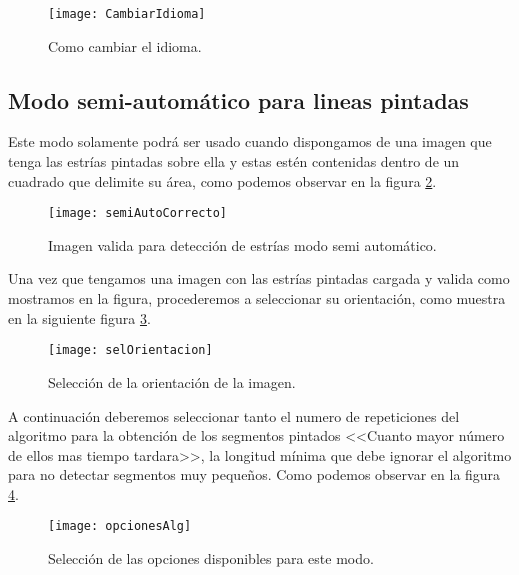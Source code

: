 \begin{figure}[h]
\centering
\texttt{[image: CambiarIdioma]}
\caption{Como cambiar el idioma.}
\label{fig:cambiarIdioma}
\end{figure}

\subsection{Modo semi-automático para lineas pintadas}

Este modo solamente podrá ser usado cuando dispongamos de una imagen que tenga las estrías pintadas sobre ella y estas estén contenidas dentro de un cuadrado que delimite su área, como podemos observar en la figura \ref{fig:semiAutoCorrecto}.



\begin{figure}[h]
\centering
\texttt{[image: semiAutoCorrecto]}
\caption{Imagen valida para detección de estrías modo semi automático.}
\label{fig:semiAutoCorrecto}
\end{figure}

Una vez que tengamos una imagen con las estrías pintadas cargada y valida como mostramos en la figura, procederemos a seleccionar su orientación, como muestra en la siguiente figura \ref{fig:selOrientacion}.

\begin{figure}[h]
\centering
\texttt{[image: selOrientacion]}
\caption{Selección de la orientación de la imagen.}
\label{fig:selOrientacion}
\end{figure}

A continuación deberemos seleccionar tanto el numero de repeticiones del algoritmo para la obtención de los segmentos pintados <<Cuanto mayor número de ellos mas tiempo tardara>>, la longitud mínima que debe ignorar el algoritmo para no detectar segmentos muy pequeños. Como podemos observar en la figura \ref{fig:opcionesAlg}.

\begin{figure}[h]
\centering
\texttt{[image: opcionesAlg]}
\caption{Selección de las opciones disponibles para este modo.}
\label{fig:opcionesAlg}
\end{figure}

